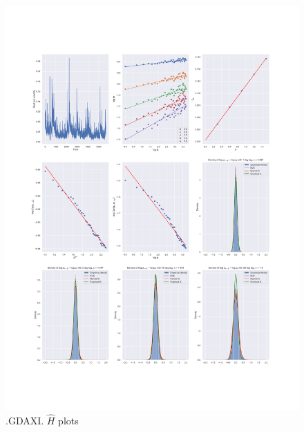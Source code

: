 	\begin{figure}[h]
		\centering
		\includegraphics[width=\linewidth]{fig/.GDAXI.pdf}
		\caption{.GDAXI. $\hat{H}$ plots}
	\end{figure}

